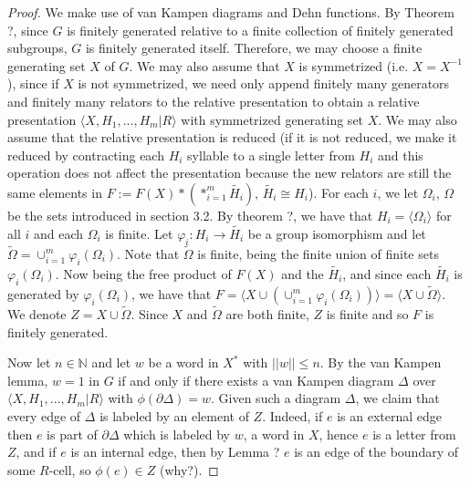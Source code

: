 \documentclass[12pt]{article}
\newcommand{\vs}{\vskip10pt}
\begin{document}
	\begin{proof}
		
		We make use of van Kampen diagrams and Dehn functions. By Theorem ?, since $G$ is finitely generated relative to a finite collection of finitely generated subgroups, $G$ is finitely generated itself. Therefore, we may choose a finite generating set $X$ of $G$. We may also assume that $X$ is symmetrized (i.e. $X = X^{-1}$), since if $X$ is not symmetrized, we need only append finitely many generators and finitely many relators to the relative presentation to obtain a relative presentation $\langle X, H_1,...,H_m \vert R \rangle$ with symmetrized generating set $X$. We may also assume that the relative presentation is reduced (if it is not reduced, we make it reduced by contracting each $H_i$ syllable to a single letter from $H_i$ and this operation does not affect the presentation because the new relators are still the same elements in $F := F(X) * (*_{i=1}^m \tilde{H_i})$, $\tilde{H_i} \cong H_i$). For each $i$, we let $\Omega_i$, $\Omega$ be the sets introduced in section 3.2. By theorem ?, we have that $H_i = \langle \Omega_i \rangle$ for all $i$ and each $\Omega_i$ is finite. Let $\varphi_i : H_i \rightarrow \tilde{H_i}$ be a group isomorphism and let $\tilde{\Omega} = \cup_{i=1}^m \varphi_i(\Omega_i)$. Note that $\tilde{\Omega}$ is finite, being the finite union of finite sets $\varphi_i(\Omega_i)$. Now being the free product of $F(X)$ and the $\tilde{H_i}$, and since each $\tilde{H_i}$ is generated by $\varphi_i(\Omega_i)$, we have that $F = \langle X \cup (\cup_{i=1}^m \varphi_i(\Omega_i)) \rangle = \langle X \cup \tilde{\Omega} \rangle$. We denote $Z = X \cup \tilde{\Omega}$. Since $X$ and $\tilde{\Omega}$ are both finite, $Z$ is finite and so $F$ is finitely generated. 
		
		\vs 
		
		Now let $n \in \mathbb{N}$ and let $w$ be a word in $X^*$ with $\vert \vert w \vert \vert \leq n$. By the van Kampen lemma, $w = 1$ in $G$ if and only if there exists a van Kampen diagram $\Delta$ over $\langle X, H_1,...,H_m \vert R \rangle$ with $\phi(\partial \Delta) = w$. Given such a diagram $\Delta$, we claim that every edge of $\Delta$ is labeled by an element of $Z$. Indeed, if $e$ is an external edge then $e$ is part of $\partial \Delta$ which is labeled by $w$, a word in $X$, hence $e$ is a letter from $Z$, and if $e$ is an internal edge, then by Lemma ? $e$ is an edge of the boundary of some $R$-cell, so $\phi(e) \in Z$ (why?). 
		
		\vs
		

\end{proof}
\end{document}
